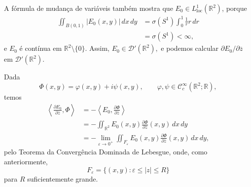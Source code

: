 \documentclass[../distribution_theory_notes.tex]{subfiles}
\begin{document}
A fórmula de mudança de variáveis também mostra que \(E_{0}\in L_{\mathrm{loc}}^{1}(\mathbb{R}^{2})\), porque
\begin{align*}
	\iint_{B(0,1)}|E_{0}(x,y)|\,dx\,dy
	 & =\sigma(S^{1})\int_{0}^{1}\frac{1}{r}r\,dr \\
	 & =\sigma(S^{1})<\infty,
\end{align*}
e \(E_{0}\) é contínua em \(\mathbb{R}^{2}\setminus\{0\}\). Assim,
\(E_{0}\in\mathcal{D}'(\mathbb{R}^{2}),\) e podemos calcular \(\partial E_{0}/\partial\overline{z}\) em \(\mathcal{D}'(\mathbb{R}^{2})\).

Dada
\[
	\Phi(x,y)=\varphi(x,y)+i\psi(x,y),
	\qquad
	\varphi,\psi\in\mathcal{C}_{c}^{\infty}(\mathbb{R}^{2};\mathbb{R}),
\]
temos
\begin{align*}
	\left\langle\frac{\partial E_{0}}{\partial\overline{z}},\Phi\right\rangle
	 & =-\left\langle E_{0},\frac{\partial\Phi}{\partial\overline{z}}\right\rangle \\
	 & =-\iint_{\mathbb{R}^{2}}E_{0}(x,y)
	\frac{\partial\Phi}{\partial\overline{z}}(x,y)\,dx\,dy                         \\
	 & =-\lim_{\varepsilon\to0^{+}}
	\iint_{F_{\varepsilon}}E_{0}(x,y)
	\frac{\partial\Phi}{\partial\overline{z}}(x,y)\,dx\,dy,
\end{align*}
pelo Teorema da Convergência Dominada de Lebesgue, onde, como anteriormente,
\[
	F_{\varepsilon}=\{(x,y):\varepsilon\leq |z|\leq R\}
\]
para \(R\) suficientemente grande.
\end{document}
